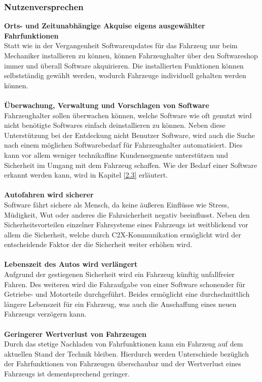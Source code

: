 \subsubsection{Nutzenversprechen}
\textbf{Orts- und Zeitunabhängige Akquise eigens ausgewählter Fahrfunktionen}\\
Statt wie in der Vergangenheit Softwareupdates für das Fahrzeug nur beim Mechaniker installieren zu können, können Fahrzeughalter über den Softwareshop immer und überall Software akquirieren. Die installierten Funktionen können selbstständig gewählt werden, wodurch Fahrzeuge individuell gehalten werden können.\\\\
\textbf{Überwachung, Verwaltung und Vorschlagen von Software}\\
Fahrzeughalter sollen überwachen können, welche Software wie oft genutzt wird nicht benötigte Softwares einfach deinstallieren zu können. Neben diese Unterstützung bei der Entdeckung nicht Benutzer Software, wird auch die Suche nach einem möglichen Softwarebedarf für Fahrzeughalter automatisiert. Dies kann vor allem weniger technikaffine Kundensegmente unterstützen und Sicherheit im Umgang mit dem Fahrzeug schaffen. Wie der Bedarf einer Software erkannt werden kann, wird in Kapitel \ref{2.3} erläutert.\\\\
\textbf{Autofahren wird sicherer}\\
Software fährt sichere als Mensch, da keine äußeren Einflüsse wie Stress, Müdigkeit, Wut oder anderes die Fahrsicherheit negativ beeinflusst. Neben den Sicherheitsvorteilen einzelner Fahrsysteme eines Fahrzeugs ist weitblickend vor allem die Sicherheit, welche durch C2X-Kommunikation ermöglicht wird der entscheidende Faktor der die Sicherheit weiter erhöhen wird.\\\\
\textbf{Lebenszeit des Autos wird verlängert}\\
Aufgrund der gestiegenen Sicherheit wird ein Fahrzeug künftig unfallfreier Fahren. Des weiteren wird die Fahraufgabe von einer Software schonender für Getriebe- und Motorteile durchgeführt. Beides ermöglicht eine durchschnittlich längere Lebenszeit für ein Fahrzeug, was auch die Anschaffung eines neuen Fahrzeugs verzögern kann.\\\\
\textbf{Geringerer Wertverlust von Fahrzeugen}\\
Durch das stetige Nachladen von Fahrfunktionen kann ein Fahrzeug auf dem aktuellen Stand der Technik bleiben. Hierdurch werden Unterschiede bezüglich der Fahrfunktionen von Fahrzeugen überschaubar und der Wertverlust eines Fahrzeugs ist dementsprechend geringer.\\\\
